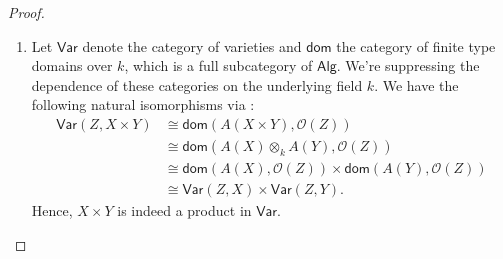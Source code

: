 \begin{proof}
\begin{enumerate}[label = (\alph*)]
        \item Let $\mathsf{Var}$ denote the category of varieties and $\mathsf{dom}$ the category of finite type domains over $k$, which is a full subcategory of $\mathsf{Alg}$. We're suppressing the dependence of these categories on the underlying field $k$. We have the following natural isomorphisms via \cite[I.3.5]{hartshorne}:
        $$
        \begin{align*}
            \mathsf{Var}(Z, X \times Y) &\cong \mathsf{dom}(A(X \times Y), \mathcal O(Z))\\
            &\cong \mathsf{dom}(A(X) \otimes_k A(Y), \mathcal O(Z))\\
            &\cong \mathsf{dom}(A(X), \mathcal O(Z)) \times \mathsf{dom}(A(Y), \mathcal O(Z))\\
            &\cong \mathsf{Var}(Z, X) \times \mathsf{Var}(Z, Y).
        \end{align*}
        $$
        Hence, $X \times Y$ is indeed a product in $\mathsf{Var}$.
    \end{enumerate}
\end{proof}
